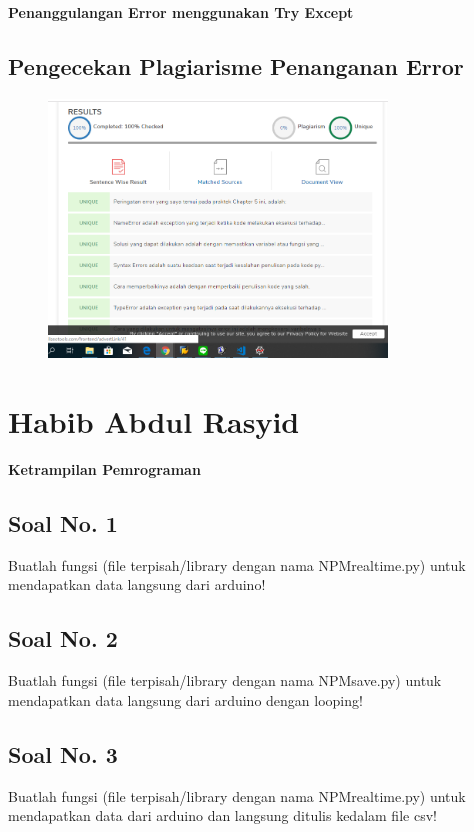 \textbf{Penanggulangan Error menggunakan Try Except}


\subsection{Pengecekan Plagiarisme Penanganan Error}
\begin{figure}[H]
	\includegraphics[width=9cm]{figures/5/Praktek/1174096/Plagiarismeerror.png}
	\centering
\end{figure}

\section{Habib Abdul Rasyid}
{\Large \textbf{Ketrampilan Pemrograman}}
\subsection{Soal No. 1}
Buatlah  fungsi  (file  terpisah/library  dengan  nama  NPMrealtime.py)  untuk mendapatkan data langsung dari arduino!



\subsection{Soal No. 2}
Buatlah fungsi (file terpisah/library dengan nama NPMsave.py) untuk mendapatkan data langsung dari arduino dengan looping!


\subsection{Soal No. 3}
Buatlah  fungsi  (file  terpisah/library  dengan  nama  NPMrealtime.py) untuk mendapatkan data dari arduino dan langsung ditulis kedalam file csv!


